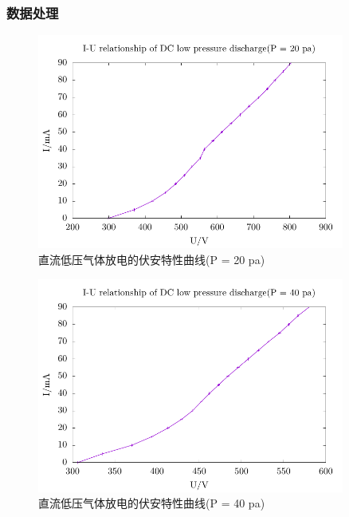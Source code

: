 \documentclass[a4paper,UTF8]{ctexart}
\begin{document}
\subsubsection{数据处理}

\begin{figure}[H]
    \centering
    \begin{minipage}[b]{0.9\textwidth}
        \centering
        \includegraphics[width=0.9\textwidth]{./pic1_1.pdf}
        \caption{直流低压气体放电的伏安特性曲线(P = 20 pa)}
    \end{minipage}
\end{figure}

\begin{figure}[H]
    \centering
    \begin{minipage}[b]{0.9\textwidth}
        \centering
        \includegraphics[width=0.9\textwidth]{./pic1_2.pdf}
        \caption{直流低压气体放电的伏安特性曲线(P = 40 pa)}
    \end{minipage}
\end{figure}
\end{document}
